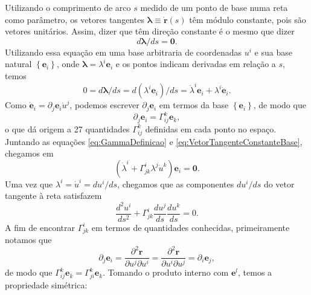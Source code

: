 Utilizando o comprimento de arco $ s $ medido de um ponto de base numa reta como parâmetro, os vetores tangentes $ \boldsymbol{\lambda} \equiv \dot{\mathbf{r}}(s) $ têm módulo constante, pois são vetores unitários. Assim, dizer que têm direção constante é o mesmo que dizer
\begin{equation}\label{eq:VetorTangenteConstante}
d \boldsymbol{\lambda} / d s=\mathbf{0} .
\end{equation}
Utilizando essa equação em uma base arbitraria de coordenadas $ u^i $ e sua base natural $ \left\{\mathbf{e}_{i}\right\} $, onde $ \boldsymbol{\lambda}=\lambda^{i} \mathbf{e}_{i} $ e os pontos indicam derivadas em relação a $ s $, temos
\begin{equation}\label{eq:VetorTangenteConstanteBase}
0=d \boldsymbol{\lambda} / d s=d\left(\lambda^{i} \mathbf{e}_{i}\right) / d s=\dot{\lambda}^{i} \mathbf{e}_{i}+\lambda^{i} \dot{\mathbf{e}}_{i} .
\end{equation}
Como $ \dot{\mathbf{e}}_{i}=\partial_{j} \mathbf{e}_{i} \dot{u}^{j} $, podemos escrever $ \partial_{j} \mathbf{e}_{i}  $ em termos da base $ \left\{\mathbf{e}_{i}\right\} $, de modo que
\begin{equation}\label{eq:GammaDefinicao}
\partial_{j} \mathbf{e}_{i}=\Gamma_{i j}^{k} \mathbf{e}_{k} ,
\end{equation}
o que dá origem a 27 quantidades $ \Gamma_{i j}^{k} $ definidas em cada ponto no espaço. Juntando as equações \eqref{eq:GammaDefinicao} e \eqref{eq:VetorTangenteConstanteBase}, chegamos em
\begin{equation}\label{eq:CoordenadasLambdaE}
	\left(\dot{\lambda}^{i}+\Gamma_{j k}^{i} \lambda^{j} \dot{u}^{k}\right) \mathbf{e}_{i}=\mathbf{0} .
\end{equation}
Uma vez que $ \lambda^{i}=\dot{u}^{i}=d u^{i} / d s $, chegamos que as componentes $ d u^{i} / d s $ do vetor tangente à reta satisfazem
\begin{equation}\label{eq:ComponentesUGamma}
\frac{d^{2} u^{i}}{d s^{2}}+\Gamma_{j k}^{i} \frac{d u^{j}}{d s} \frac{d u^{k}}{d s}=0 .
\end{equation} 
A fim de encontrar $ \Gamma_{j k}^{i} $ em termos de quantidades conhecidas, primeiramente notamos que
\[
\partial_{j} \mathbf{e}_{i}=\frac{\partial^{2} \mathbf{r}}{\partial u^{j} \partial u^{i}}=\frac{\partial^{2} \mathbf{r}}{\partial u^{i} \partial u^{j}}=\partial_{i} \mathbf{e}_{j} ,
\]
de modo que $ \Gamma_{i j}^{k} \mathbf{e}_{k}=\Gamma_{j i}^{k} \mathbf{e}_{k} $. Tomando o produto interno com $ \mathbf{e}^{l} $, temos a propriedade simétrica:
